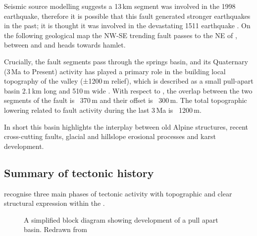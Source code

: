 Seismic source modelling suggests a 13\,km  segment was involved in the 1998 earthquake, therefore it is possible that this fault generated stronger earthquakes in the past; it is thought it was involved in the devastating 1511 earthquake \citep{fitzko2005constraints}.
On the following geological map  the NW-SE trending fault passes to the NE of , between  and  and heads towards  hamlet.

Crucially, the  fault segments pass through the  springs basin, and its Quaternary (3\,Ma to Present) activity has played a primary role in the building local topography of the  valley (±1200\,m relief), which is described as a small pull-apart basin 2.1\,km long and 510\,m wide \citep{cunningham2006application,kastelic2008neo}. With respect to , the overlap between the two segments of the  fault is ~370\,m and their offset is ~300\,m. The total topographic lowering related to fault activity during the last 3\,Ma is ~1200\,m.

In short this basin highlights the interplay between old Alpine structures, recent cross-cutting faults, glacial and hillslope erosional processes and karst development.

\subsection{Summary of tectonic history}
\label{par:summary of tectonic}
\citet{kastelic2008neo} recognise three main phases of tectonic activity with topographic and clear structural expression within the .


\begin{figure}[t!]
\checkoddpage \ifoddpage \forcerectofloat \else \forceversofloat \fi
\centering
{}
\caption{A simplified block diagram showing development of a pull apart basin. Redrawn from \citet{WU20091608}}
\label{fig:fault}
\end{figure}

